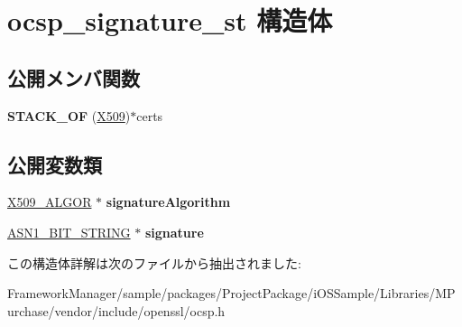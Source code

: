 \hypertarget{structocsp__signature__st}{}\section{ocsp\+\_\+signature\+\_\+st 構造体}
\label{structocsp__signature__st}
\subsection*{公開メンバ関数}
\begin{DoxyCompactItemize}
\item 
\hypertarget{structocsp__signature__st_adc334555122689e65ef7a051a0eb681e}{}{\bfseries S\+T\+A\+C\+K\+\_\+\+O\+F} (\hyperlink{structx509__st}{X509})$\ast$certs\label{structocsp__signature__st_adc334555122689e65ef7a051a0eb681e}

\end{DoxyCompactItemize}
\subsection*{公開変数類}
\begin{DoxyCompactItemize}
\item 
\hypertarget{structocsp__signature__st_a6c7ac15576a2cbfeae06fd4d1134d324}{}\hyperlink{struct_x509__algor__st}{X509\+\_\+\+A\+L\+G\+O\+R} $\ast$ {\bfseries signature\+Algorithm}\label{structocsp__signature__st_a6c7ac15576a2cbfeae06fd4d1134d324}

\item 
\hypertarget{structocsp__signature__st_a56ff8ee97dc7551d6b0d5981a183135e}{}\hyperlink{structasn1__string__st}{A\+S\+N1\+\_\+\+B\+I\+T\+\_\+\+S\+T\+R\+I\+N\+G} $\ast$ {\bfseries signature}\label{structocsp__signature__st_a56ff8ee97dc7551d6b0d5981a183135e}

\end{DoxyCompactItemize}


この構造体詳解は次のファイルから抽出されました\+:\begin{DoxyCompactItemize}
\item 
Framework\+Manager/sample/packages/\+Project\+Package/i\+O\+S\+Sample/\+Libraries/\+M\+Purchase/vendor/include/openssl/ocsp.\+h\end{DoxyCompactItemize}
